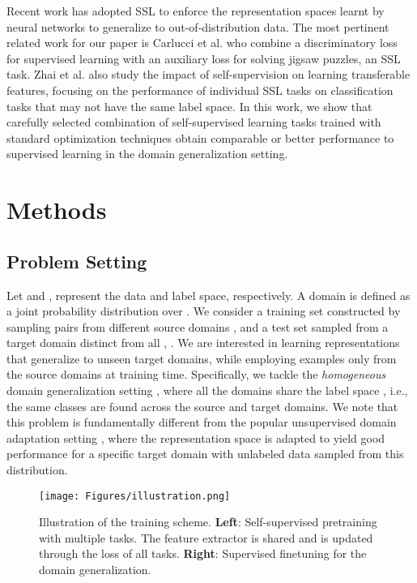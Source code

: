 \documentclass[runningheads]{llncs}
\begin{document}
Recent work has adopted SSL to enforce the representation spaces learnt by neural networks to generalize to out-of-distribution data. The most pertinent related work for our paper is Carlucci et al. \cite{carlucci2019domain} who combine a discriminatory loss for supervised learning with an auxiliary loss for solving jigsaw puzzles, an SSL task. Zhai et al. \cite{zhai2019visual} also study the impact of self-supervision on learning transferable features, focusing on the performance of individual SSL tasks on classification tasks that may not have the same label space.  In this work, we show that carefully selected combination of self-supervised learning tasks trained with standard optimization techniques obtain comparable or better performance to supervised learning in the domain generalization setting. 


\section{Methods}
\subsection{Problem Setting}
Let  and , represent the data and label space, respectively. A domain  is defined as a joint probability distribution over . We consider  a training set constructed by sampling pairs  from  different source domains , and a test set  sampled from a target domain  distinct from all , . We are interested in learning representations that generalize to unseen target domains, while employing examples only from the source domains at training time. Specifically, we tackle the \textit{homogeneous} domain generalization setting \cite{li2019episodic}, where all the domains share the label space , i.e., the same classes are found across the source and target domains.  We note that this problem is fundamentally different from the popular unsupervised domain adaptation setting \cite{ben2010theory}, where the representation space is adapted to yield good performance for a specific target domain with unlabeled data sampled from this distribution.

\begin{figure}[t]
    \centering
    \texttt{[image: Figures/illustration.png]}
    \caption{Illustration of the training scheme. \textbf{Left}: Self-supervised pretraining with multiple tasks.  The feature extractor is shared and is updated through the loss of all tasks. \textbf{Right}: Supervised finetuning for the domain generalization.}
    \label{fig:approach}
\end{figure}
\end{document}
